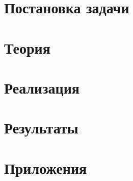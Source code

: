 \documentclass[main.tex]{subfiles}
\begin{document}
\section{Постановка задачи}

\section{Теория}

\section{Реализация}

\section{Результаты}

\section{Приложения}

\end{document}
